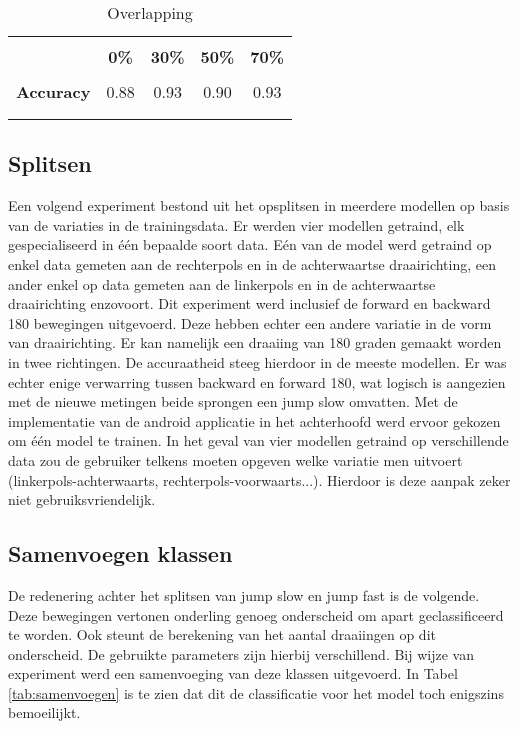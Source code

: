 \begin{table}[!htpd]
  \centering
  \caption{Overlapping}
  \label{tab:overlap}
\begin{tabular}{lcccc}
 \hline \\
\textbf{}         & \textbf{0\%} & \textbf{30\%} & \textbf{50\%} & \textbf{70\%} \\
\hline \\
\textbf{Accuracy} & 0.88         & 0.93          & 0.90          & 0.93    \\\\
\hline \\
\end{tabular}
\end{table}

\subsection{Splitsen}
Een volgend experiment bestond uit het opsplitsen in meerdere modellen op basis van de variaties in de trainingsdata. Er werden vier modellen getraind, elk gespecialiseerd in één bepaalde soort data. Eén van de model werd getraind op enkel data gemeten aan de rechterpols en in de achterwaartse draairichting, een ander enkel op data gemeten aan de linkerpols en in de achterwaartse draairichting enzovoort. Dit experiment werd inclusief de forward en backward 180 bewegingen uitgevoerd. Deze hebben echter een andere variatie in de vorm van draairichting. Er kan namelijk een draaiing van 180 graden gemaakt worden in twee  richtingen. De accuraatheid steeg hierdoor in de meeste modellen. Er was echter enige verwarring tussen backward en forward 180, wat logisch is aangezien met de nieuwe metingen beide sprongen een jump slow omvatten. 
Met de implementatie van de android applicatie in het achterhoofd werd ervoor gekozen om één model te trainen. In het geval van vier modellen getraind op verschillende data zou de gebruiker telkens moeten opgeven welke variatie men uitvoert (linkerpols-achterwaarts, rechterpols-voorwaarts...). Hierdoor is deze aanpak zeker niet gebruiksvriendelijk.

\subsection{Samenvoegen klassen}
De redenering achter het splitsen van jump slow en jump fast is de volgende. Deze bewegingen vertonen onderling genoeg onderscheid om apart geclassificeerd te worden. Ook steunt de berekening van het aantal draaiingen op dit onderscheid. De gebruikte parameters zijn hierbij verschillend. Bij wijze van experiment werd een samenvoeging van deze klassen uitgevoerd. In Tabel \ref{tab:samenvoegen} is te zien dat dit de classificatie voor het model toch enigszins bemoeilijkt.


